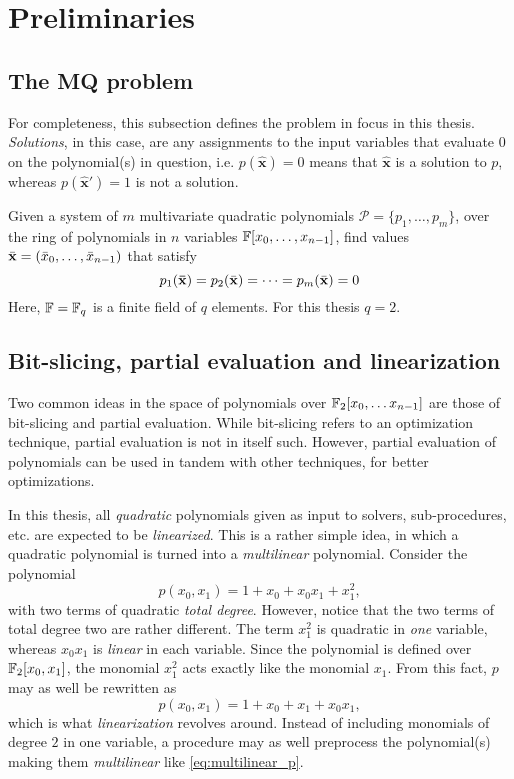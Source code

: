 \chapter{Preliminaries} \label{sec:prereq}
\section{The MQ problem} \label{sec:prereq:problem}
For completeness, this subsection defines the problem in focus in this thesis. \textit{Solutions}, in this case, are any assignments to the input variables that evaluate $0$ on the polynomial(s) in question, i.e. $p(\hat{\mathbf{x}}) = 0$ means that $\hat{\mathbf{x}}$ is a solution to $p$, whereas $p(\hat{\mathbf{x}}') = 1$ is not a solution.
\begin{defn}\label{sec1:def:mq}
    Given a system of $m$ multivariate quadratic polynomials $\mathcal{P} = \{p_{1}, \dots, p_{m}\}$, over the ring of polynomials in $n$ variables $\mathbb{F}[x_0, \dots, x_{n - 1}]$, find values $\Bar{\mathbf{x}} = (\Bar{x}_0, \dots, \Bar{x}_{n - 1})$ that satisfy
    $$
        p_{1}(\mathbf{\Bar{\mathbf{x}}}) =  p_{2}(\Bar{\mathbf{x}}) = \dots = p_{m}(\Bar{\mathbf{x}}) = 0 
    $$
    Here, $\mathbb{F} = \mathbb{F}_q$ is a finite field of $q$ elements. For this thesis $q = 2$.
\end{defn}

\section{Bit-slicing, partial evaluation and linearization}
Two common ideas in the space of polynomials over $\mathbb{F}_2[x_0,\dots x_{n - 1}]$ are those of bit-slicing and partial evaluation. While bit-slicing refers to an optimization technique, partial evaluation is not in itself such. However, partial evaluation of polynomials can be used in tandem with other techniques, for better optimizations.

In this thesis, all \textit{quadratic} polynomials given as input to solvers, sub-procedures, etc. are expected to be \textit{linearized}. This is a rather simple idea, in which a quadratic polynomial is turned into a \textit{multilinear} polynomial. Consider the polynomial
$$
    p(x_0, x_1) = 1 + x_0 + x_0x_1 + x_1^2, 
$$
with two terms of quadratic \textit{total degree}. However, notice that the two terms of total degree two are rather different. The term $x_1^2$ is quadratic in \textit{one} variable, whereas $x_0x_1$ is \textit{linear} in each variable. Since the polynomial is defined over $\mathbb{F}_2[x_0,x_1]$, the monomial $x_1^2$ acts exactly like the monomial $x_1$. From this fact, $p$ may as well be rewritten as 
\begin{equation} \label{eq:multilinear_p}
    p(x_0, x_1) = 1 + x_0 + x_1 + x_0x_1,
\end{equation}
which is what \textit{linearization} revolves around. Instead of including monomials of degree $2$ in one variable, a procedure may as well preprocess the polynomial(s) making them \textit{multilinear} like \cref{eq:multilinear_p}.

